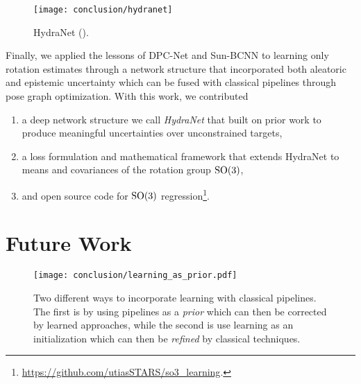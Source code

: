 \begin{wrapfigure}{r}{0.3\textwidth}
  \begin{center}
  	\vspace{-20pt}
    \texttt{[image: conclusion/hydranet]}
     \vspace{-15pt}
  \end{center}
  \caption{HydraNet ().}
  \vspace{-5pt}
\end{wrapfigure}


Finally, we applied the lessons of DPC-Net and Sun-BCNN to learning only rotation estimates through a network structure that incorporated both aleatoric and epistemic uncertainty which can be fused with classical pipelines through pose graph optimization. With this work, we contributed
\begin{enumerate}
\item a deep network structure we call \textit{HydraNet} that built on prior work \cite{Lakshminarayanan2017,Osband2016} to produce meaningful uncertainties over unconstrained targets,
\item a loss formulation and mathematical framework that extends HydraNet to means and covariances of the rotation group $\mathrm{SO}(3)$,
\item and open source code for $\mathrm{SO}(3)$ regression\footnote{\url{https://github.com/utiasSTARS/so3_learning}.}.
\end{enumerate}



\section{Future Work}

\begin{figure}
\begin{center}
		\texttt{[image: conclusion/learning\_as\_prior.pdf]}
		\caption{Two different ways to incorporate learning with classical pipelines. The first is by using pipelines as a \textit{prior} which can then be corrected by learned approaches, while the second is use learning as an initialization which can then be \textit{refined} by classical techniques.}
  	\label{fig:conc_learning_as_prior}
\end{center}
\end{figure}


